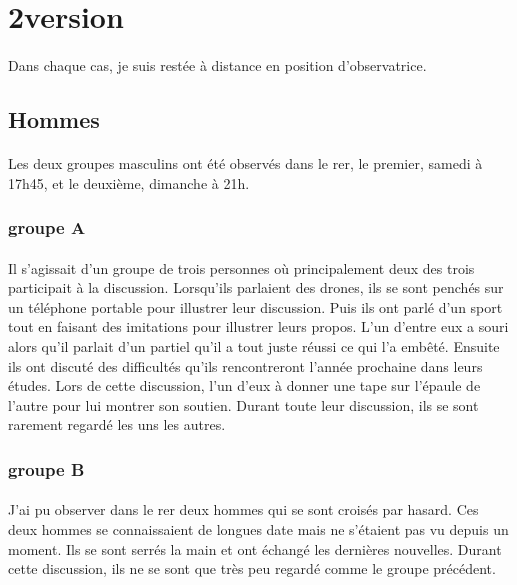 \section{2\ieme version}
\paragraph{}
Dans chaque cas, je suis restée à distance en position d’observatrice.
\subsection{Hommes}
\paragraph{}
Les deux groupes masculins ont été observés dans le rer, le premier, samedi à 17h45, et le deuxième, dimanche à 21h.
\subsubsection{groupe A}
\paragraph{}
	Il s’agissait d’un groupe de trois personnes où principalement deux des trois participait à la discussion. Lorsqu’ils parlaient des drones, ils se sont penchés sur un téléphone portable pour illustrer leur discussion. Puis ils ont parlé d’un sport tout en faisant des imitations pour illustrer leurs propos. L’un d’entre eux a souri alors qu’il parlait d’un partiel qu’il a tout juste réussi ce qui l’a embêté. Ensuite ils ont discuté des difficultés qu’ils rencontreront l’année prochaine dans leurs études. Lors de cette discussion, l’un d’eux à donner une tape sur l’épaule de l’autre pour lui montrer son soutien. Durant toute leur discussion, ils se sont rarement regardé les uns les autres.
\subsubsection{groupe B}
\paragraph{}
	J’ai pu observer dans le rer deux hommes qui se sont croisés par hasard. Ces deux hommes se connaissaient de longues date mais ne s’étaient pas vu depuis un moment. Ils se sont serrés la main et ont échangé les dernières nouvelles. Durant cette discussion, ils ne se sont que très peu regardé comme le groupe précédent.
	
